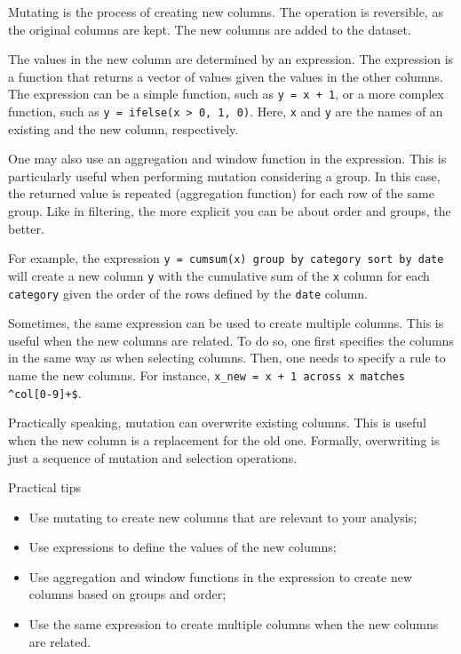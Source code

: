 Mutating is the process of creating new columns.  The operation is reversible, as the
original columns are kept.  The new columns are added to the dataset.

The values in the new column are determined by an expression.  The expression is a
function that returns a vector of values given the values in the other columns.  The
expression can be a simple function, such as \texttt{y = x + 1}, or a more complex
function, such as \texttt{y = ifelse(x > 0, 1, 0)}.  Here, \texttt{x} and \texttt{y} are
the names of an existing and the new column, respectively.

One may also use an aggregation and window function in the expression. This is particularly
useful when performing mutation considering a group.  In this case, the returned value is
repeated (aggregation function) for each row of the same group.  Like in filtering, the
more explicit you can be about order and groups, the better.

For example, the expression \texttt{y = cumsum(x) group by category sort by date} will
create a new column \texttt{y} with the cumulative sum of the \texttt{x} column for each
\texttt{category} given the order of the rows defined by the \texttt{date} column.

Sometimes, the same expression can be used to create multiple columns.  This is useful
when the new columns are related.  To do so, one first specifies the columns in the same way as
when selecting columns.  Then, one needs to specify a rule to name the new columns.
For instance, \texttt{x\_new = x + 1 across x matches \textasciicircum{}col[0-9]+\$}.

Practically speaking, mutation can overwrite existing columns.  This is useful when the
new column is a replacement for the old one.  Formally, overwriting is just a sequence of
mutation and selection operations.

\begin{hlbox}{Practical tips}
  \begin{itemize}
    \item Use mutating to create new columns that are relevant to your analysis;
    \item Use expressions to define the values of the new columns;
    \item Use aggregation and window functions in the expression to create new columns based on
      groups and order;
    \item Use the same expression to create multiple columns when the new columns are related.
  \end{itemize}
\end{hlbox}

